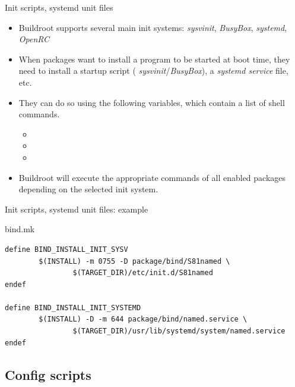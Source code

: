 \begin{frame}{Init scripts, systemd unit files}

\begin{itemize}

\item Buildroot supports several main init systems: {\em sysvinit},
  {\em BusyBox}, {\em systemd}, {\em OpenRC}

\item When packages want to install a program to be started at boot
  time, they need to install a startup script ({\em
    sysvinit}/{\em BusyBox}), a {\em systemd service} file, etc.

\item They can do so using the following variables, which contain a
  list of shell commands.
  \begin{itemize}
  \item {}
  \item {}
  \item {}
  \end{itemize}

\item Buildroot will execute the appropriate
   commands of all enabled packages
  depending on the selected init system.

\end{itemize}

\end{frame}

\begin{frame}[fragile]{Init scripts, systemd unit files: example}

\begin{block}{bind.mk}
  \begin{verbatim}
define BIND_INSTALL_INIT_SYSV
        $(INSTALL) -m 0755 -D package/bind/S81named \
                $(TARGET_DIR)/etc/init.d/S81named
endef

define BIND_INSTALL_INIT_SYSTEMD
        $(INSTALL) -D -m 644 package/bind/named.service \
                $(TARGET_DIR)/usr/lib/systemd/system/named.service
endef
  \end{verbatim}
\end{block}

\end{frame}

\subsection{Config scripts}

